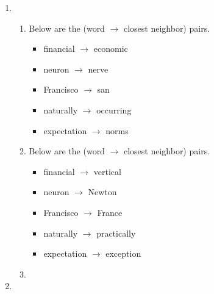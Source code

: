 \documentclass[12pt]{article}
\begin{document}
\begin{enumerate}[label=\textbf{\arabic*.}]
\begin{enumerate}[label=(\alph*)]
    \item
    \begin{enumerate}[label=\roman*.]
      \item Below are the (word $\rightarrow$ closest neighbor) pairs.
        \begin{itemize}
          \item financial $\rightarrow$ economic
          \item neuron $\rightarrow$ nerve
          \item Francisco $\rightarrow$ san
          \item naturally $\rightarrow$ occurring
          \item expectation $\rightarrow$ norms
        \end{itemize}
      \item Below are the (word $\rightarrow$ closest neighbor) pairs.
        \begin{itemize}
          \item financial $\rightarrow$ vertical
          \item neuron $\rightarrow$ Newton
          \item Francisco $\rightarrow$ France
          \item naturally $\rightarrow$ practically
          \item expectation $\rightarrow$ exception
        \end{itemize}
      \item
    \end{enumerate}
    \item
  \end{enumerate}
\end{enumerate}
\end{document}
